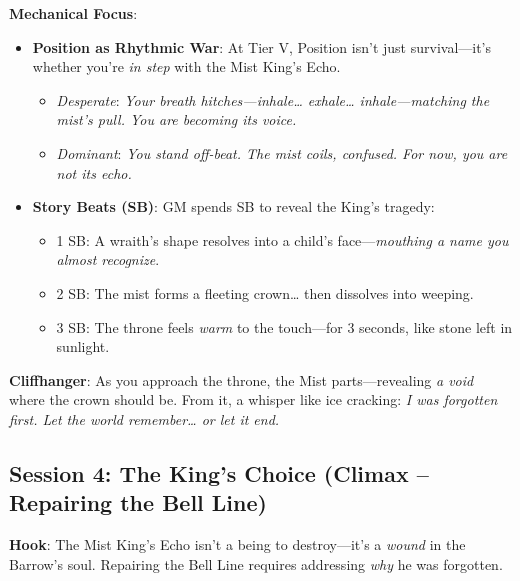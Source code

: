\documentclass[12pt]{article}
\begin{document}
\textbf{Mechanical Focus}:
\begin{itemize}
  \item \textbf{Position as Rhythmic War}: At Tier V, Position isn't just survival---it's whether you're \textit{in step} with the Mist King's Echo.
  \begin{itemize}
    \item \textit{Desperate}: \textit{Your breath hitches---\textit{inhale\ldots{} exhale\ldots{} inhale}---matching the mist's pull. You are \textit{becoming} its voice.}
    \item \textit{Dominant}: \textit{You stand \textit{off-beat}. The mist coils, confused. For now, you are not its echo.}
  \end{itemize}
  \item \textbf{Story Beats (SB)}: GM spends SB to reveal the King's tragedy:
  \begin{itemize}
    \item 1 SB: A wraith's shape resolves into a child's face---\textit{mouthing a name you almost recognize}.
    \item 2 SB: The mist forms a fleeting crown\ldots{} then dissolves into weeping.
    \item 3 SB: The throne feels \textit{warm} to the touch---for 3 seconds, like stone left in sunlight.
  \end{itemize}
\end{itemize}

\textbf{Cliffhanger}: As you approach the throne, the Mist parts---revealing \textit{a void} where the crown should be. From it, a whisper like ice cracking: \textit{I was forgotten first. Let the world remember\ldots{} or let it end.}

\subsection{Session 4: The King's Choice (Climax -- Repairing the Bell Line)}
\textbf{Hook}: The Mist King's Echo isn't a being to destroy---it's a \textit{wound} in the Barrow's soul. Repairing the Bell Line requires addressing \textit{why} he was forgotten.
\end{document}
